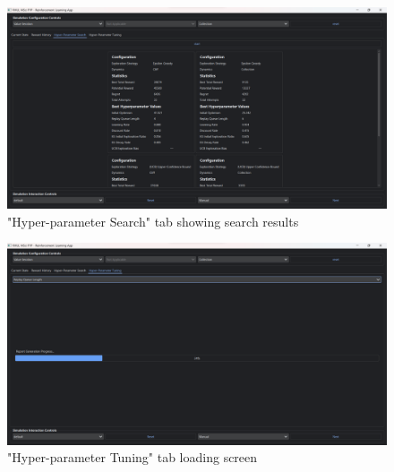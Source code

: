 \documentclass[]{final_report}
\begin{document}
\begin{figure}[H]
  \centering
  
  \includegraphics[trim={0 0 0 6mm},clip,width=\textwidth]{ui-screenshots/random-search.png}
  
  \caption{\label{fig:screenshot:current-state} "Hyper-parameter Search" tab showing search results}
\end{figure}


\begin{figure}[H]
  \centering
  
  \includegraphics[trim={0 0 0 6mm},clip,width=\textwidth]{ui-screenshots/loading-screen.png}
  
  \caption{\label{fig:screenshot:current-state} "Hyper-parameter Tuning" tab loading screen}
\end{figure}
\end{document}
